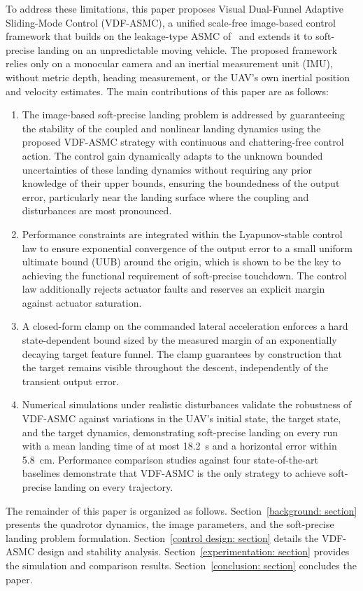 \documentclass{IEEEtaes}
\begin{document}
To address these limitations, this paper proposes Visual Dual-Funnel Adaptive Sliding-Mode Control (VDF-ASMC), a unified scale-free image-based control framework that builds on the leakage-type ASMC of~\cite{singhal2025} and extends it to soft-precise landing on an unpredictable moving vehicle. The proposed framework relies only on a monocular camera and an inertial measurement unit (IMU), without metric depth, heading measurement, or the UAV's own inertial position and velocity estimates. The main contributions of this paper are as follows:
\begin{enumerate}
\item The image-based soft-precise landing problem is addressed by guaranteeing the stability of the coupled and nonlinear landing dynamics using the proposed VDF-ASMC strategy with continuous and chattering-free control action. The control gain dynamically adapts to the unknown bounded uncertainties of these landing dynamics without requiring any prior knowledge of their upper bounds, ensuring the boundedness of the output error, particularly near the landing surface where the coupling and disturbances are most pronounced.
\item Performance constraints are integrated within the Lyapunov-stable control law to ensure exponential convergence of the output error to a small uniform ultimate bound (UUB) around the origin, which is shown to be the key to achieving the functional requirement of soft-precise touchdown. The control law additionally rejects actuator faults and reserves an explicit margin against actuator saturation.
\item A closed-form clamp on the commanded lateral acceleration enforces a hard state-dependent bound sized by the measured margin of an exponentially decaying target feature funnel. The clamp guarantees by construction that the target remains visible throughout the descent, independently of the transient output error.
\item Numerical simulations under realistic disturbances validate the robustness of VDF-ASMC against variations in the UAV's initial state, the target state, and the target dynamics, demonstrating soft-precise landing on every run with a mean landing time of at most 18.2~s and a horizontal error within 5.8~cm. Performance comparison studies against four state-of-the-art baselines demonstrate that VDF-ASMC is the only strategy to achieve soft-precise landing on every trajectory.
\end{enumerate}
The remainder of this paper is organized as follows. Section~\ref{background: section} presents the quadrotor dynamics, the image parameters, and the soft-precise landing problem formulation. Section~\ref{control design: section} details the VDF-ASMC design and stability analysis. Section~\ref{experimentation: section} provides the simulation and comparison results. Section~\ref{conclusion: section} concludes the paper.
\end{document}
